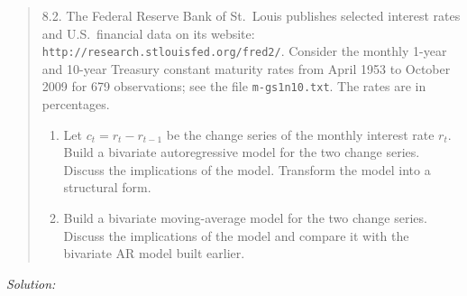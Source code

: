 \documentclass[11pt,a4paper]{article}
\newif\ifsolucoes
\newcommand{\espacoresol}{4.5cm}   %
\newcommand{\resolespaco}{\ifsolucoes\else\par\textit{Solution:}\vspace{\espacoresol}\par\fi}
\begin{document}
\begin{quote}\small
8.2. The Federal Reserve Bank of St.\ Louis publishes selected interest rates and U.S.\ financial data
on its website: \texttt{http://research.stlouisfed.org/fred2/}. Consider the monthly 1-year and
10-year Treasury constant maturity rates from April 1953 to October 2009 for 679 observations; see
the file \texttt{m-gs1n10.txt}. The rates are in percentages.
\begin{enumerate}[label=(\alph*),leftmargin=2em]
\item Let $c_t=r_t-r_{t-1}$ be the change series of the monthly interest rate $r_t$. Build a
bivariate autoregressive model for the two change series. Discuss the implications of the model.
Transform the model into a structural form.
\item Build a bivariate moving-average model for the two change series. Discuss the implications of
the model and compare it with the bivariate AR model built earlier.
\end{enumerate}
\end{quote}
\resolespaco
\end{document}
